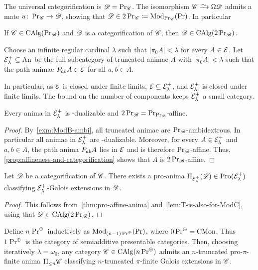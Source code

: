 \documentclass[english,svgnames,table]{article}
\begin{document}
    The universal categorification is $\cD = \ModC$. The isomorphism $\cC \isoto \Omega \cD$ admits a mate $u \colon \ModC \to \cD$, showing that $\cD \in 2\ModC \coloneq \Mod_{\ModC}(\Pr)$. In particular
    \begin{corollary}
        If $\cC \in \CAlgB$ and $\cD$ is a categorification of $\cC$, then $\cD \in \CAlg(2\ModB)$.
    \end{corollary}

    \begin{definition}
        Choose an infinite regular cardinal $\lambda$ such that $|\pi_0 A| < \lambda$ for every $A\in\cT$.
        Let $\cT^+_{\lambda} \subseteq \An$ be the full subcategory of truncated animae $A$ with $|\pi_0 A|<\lambda$ such that the path animae $\Path_{ab} A \in \cT$ for all $a,b \in A$.
    \end{definition}
    In particular, as $\cT$ is closed under finite limits, $\cT \subseteq \cT^+_{\lambda}$, and $\cT^+_{\lambda}$ is closed under finite limits.
    The bound on the number of components keeps $\cT^+_{\lambda}$ a small category.
    
    \begin{lemma}
    \label{lem:T-is-also-for-ModC}
        Every anima in $\cT^+_{\lambda}$ is \CO[\ModB]-dualizable and $2\ModB = \ModC[\ModB]$-affine.
    \end{lemma}
    \begin{proof}
        By~\cref{exm:ModB-ambi}, all truncated animae are $\ModB$-ambidextrous. In particular all animae in $\cT^+_{\lambda}$ are \CO[\ModB]-dualizable.
        Moreover, for every $A \in \cT^+_{\lambda}$ and $a,b \in A$, the path anima $\Path_{ab} A$ lies in $\cT$ and is therefore $\ModB$-affine. Thus, \cref{prop:affineness-and-categorification} shows that $A$ is $2\ModB$-affine.
    \end{proof}
    
    \begin{corollary}
        Let $\cD$ be a categorification of $\cC$.
        There exists a pro-anima $\piT[\cT^+_{\lambda}](\cD) \in \Pro(\cT^+_{\lambda})$ classifying $\cT^+_{\lambda}$-Galois extensions in $\cD$.
    \end{corollary}
    \begin{proof}
        This follows from~\cref{thm:pro-affine-anima} and~\cref{lem:T-is-also-for-ModC}, using that $\cD \in \CAlg(2\ModB)$.
    \end{proof}

    \begin{remark}
        Define $n\Pr^{\oplus}$ inductively as $\Mod_{(n-1)\Pr^{\oplus}}(\Pr)$, where $0\Pr^{\oplus} = \CMon$. Thus $1\Pr^{\oplus}$ is the category of semiadditive presentable categories.
        Then, choosing iteratively $\lambda = \omega_0$, any category $\cC \in \CAlg(n\Pr^{\oplus})$ admits an $n$-truncated pro-$\pi$-finite anima $\pim[n]\cC$ classifying $n$-truncated $\pi$-finite Galois extensions in $\cC$.
    \end{remark}
    
\end{document}
